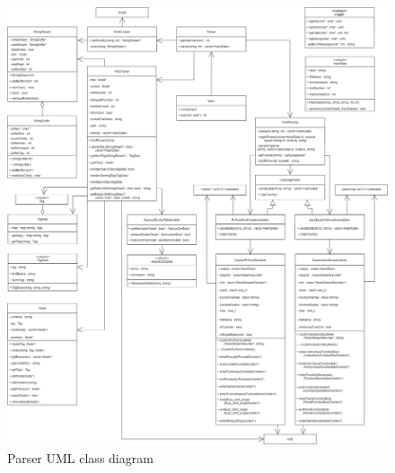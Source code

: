 \documentclass{article}
\begin{document}
\begin{figure}
    \centering
    \includegraphics[width = \linewidth]{ParserUML.png}
    \caption{Parser UML class diagram}
    \label{fig:umlparser}
\end{figure}
\end{document}
